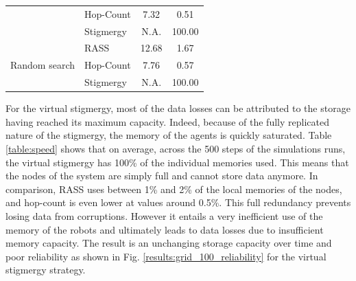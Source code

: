 \documentclass[sigconf]{aamas}
\begin{document}
\begin{table}[t]
\begin{tabular}{llcc}
                                      & Hop-Count                              & 7.32                                                                      & 0.51                                                                 \\
                                      & Stigmergy                              & N.A.                                                                      & 100.00                                                               \\ \midrule
\multirow{3}{*}{Random search}        & RASS                                   & 12.68                                                                     & 1.67                                                                 \\
                                      & Hop-Count                              & 7.76                                                                      & 0.57                                                                 \\
                                      & Stigmergy                              & N.A.                                                                      & 100.00                                                               \\
\bottomrule
\end{tabular}
\vspace{-3mm}
\end{table}


For the virtual stigmergy, most of the data losses can be attributed to the storage having reached its maximum capacity. Indeed, because of the fully replicated nature of the stigmergy, the memory of the agents is quickly saturated. Table \ref{table:speed} shows that on average, across the 500 steps of the simulations runs, the virtual stigmergy has 100\% of the individual memories used. This means that the nodes of the system are simply full and cannot store data anymore. In comparison, RASS uses between 1\% and 2\% of the local memories of the nodes, and hop-count is even lower at values around 0.5\%. This full redundancy prevents losing data from corruptions. However it entails a very inefficient use of the memory of the robots and ultimately leads to data losses due to insufficient memory capacity. The result is an unchanging storage capacity over time and poor reliability as shown in Fig. \ref{results:grid_100_reliability} for the virtual stigmergy strategy.
\end{document}
